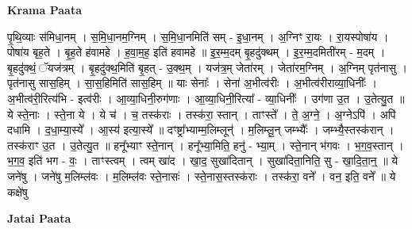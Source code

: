 \documentclass[17pt]{extarticle}
\begin{document}
\textbf{Krama Paata} \newline

पृ॒थि॒व्याः स॑मिधा॒नम् । स॒मि॒धा॒नम॒ग्निम् । स॒मि॒धा॒नमिति॑ सम् - इ॒धा॒नम् । अ॒ग्निꣳ रा॒यः । रा॒यस्पोषा॑य । पोषा॑य बृह॒ते । बृ॒ह॒ते ह॑वामहे । ह॒वा॒म॒ह॒ इति॑ हवामहे ॥ इ॒र॒म्म॒दम् बृ॒हदु॑क्थम् । इ॒र॒म्म॒दमिती॑रम् - म॒दम् । बृ॒हदु॑क्थं॒ ॅयज॑त्रम् । बृ॒हदु॑क्थ॒मिति॑ बृ॒हत् - उ॒क्थ॒म् । यज॑त्र॒म् जेता॑रम् । जेता॑रम॒ग्निम् । अ॒ग्निम् पृत॑नासु । पृत॑नासु सास॒हिम् । सा॒स॒हिमिति॑ सास॒हिम् ॥ याः सेनाः᳚ । सेना॑ अ॒भीत्व॑रीः । अ॒भीत्व॑रीराव्या॒धिनीः᳚ । अ॒भीत्व॑री॒रित्य॑भि - इत्व॑रीः । आ॒व्या॒धिनी॒रुग॑णाः । आ॒व्या॒धिनी॒रित्या᳚ - व्या॒धिनीः᳚ । उग॑णा उ॒त । उ॒तेत्यु॒त ॥ ये स्ते॒नाः । स्ते॒ना ये । ये च॑ । च॒ तस्क॑राः । तस्क॑रा॒ स्तान् । ताꣳस्ते᳚ । ते॒ अ॒ग्ने॒ । अ॒ग्नेऽपि॑ । अपि॑ दधामि । द॒धा॒म्या॒स्ये᳚ । आ॒स्य॑ इत्या॒स्ये᳚ ॥ दꣳष्ट्रा᳚भ्याम्म॒लिम्लून्॑ । म॒लिम्लू॒न् जम्भ्यैः᳚ । जम्भ्यै॒स्तस्क॑रान् । तस्क॑राꣳ उ॒त । उ॒तेत्यु॒त ॥ हनू᳚भ्याꣳ स्ते॒नान् । हनू᳚भ्या॒मिति॒ हनु॑ - भ्या॒म् । स्ते॒नान् भ॑गवः । भ॒ग॒व॒स्तान् । भ॒ग॒व॒ इति॑ भग - वः॒ । ताꣳस्त्वम् । त्वम् खा॑द । खा॒द॒ सुखा॑दितान् । सुखा॑दिता॒निति॒ सु - खा॒दि॒ता॒न्॒ ॥ ये जने॑षु । जने॑षु म॒लिम्ल॑वः । म॒लिम्ल॑वः स्ते॒नासः॑ । स्ते॒नास॒स्तस्क॑राः । तस्क॑रा॒ वने᳚ । वन॒ इति॒ वने᳚ ॥ ये कक्षे॑षु \newline

\textbf{Jatai Paata} \newline
\end{document}
